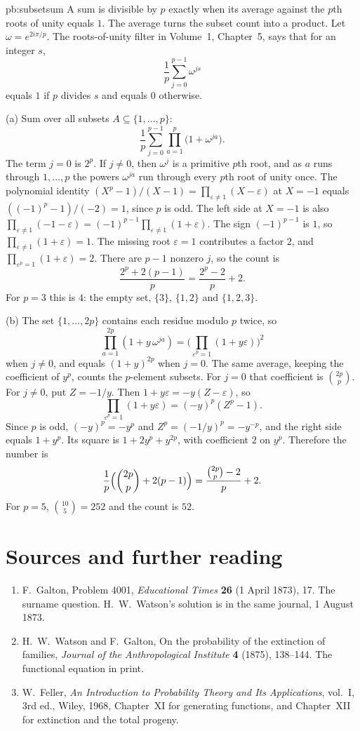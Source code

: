\begin{solution}{pb:subsetsum}
\idea A sum is divisible by $p$ exactly when its average against the $p$th roots of unity equals $1$. The average turns the subset count into a product.
\writeup Let $\omega=e^{2i\pi/p}$. The roots-of-unity filter in Volume~1, Chapter~5, says that for an integer $s$,
\[
 \frac1p\sum_{j=0}^{p-1}\omega^{js}
\]
equals $1$ if $p$ divides $s$ and equals $0$ otherwise.

(a) Sum over all subsets $A\subseteq\{1,\ldots,p\}$:
\[
 \frac1p\sum_{j=0}^{p-1}\prod_{a=1}^p\bigl(1+\omega^{ja}\bigr).
\]
The term $j=0$ is $2^p$. If $j\not=0$, then $\omega^j$ is a primitive $p$th root, and as $a$ runs through $1,\ldots,p$ the powers $\omega^{ja}$ run through every $p$th root of unity once. The polynomial identity $(X^p-1)/(X-1)=\prod_{\varepsilon\ne1}(X-\varepsilon)$ at $X=-1$ equals $((-1)^p-1)/(-2)=1$, since $p$ is odd. The left side at $X=-1$ is also $\prod_{\varepsilon\ne1}(-1-\varepsilon)=(-1)^{p-1}\prod_{\varepsilon\ne1}(1+\varepsilon)$. The sign $(-1)^{p-1}$ is $1$, so $\prod_{\varepsilon\ne1}(1+\varepsilon)=1$. The missing root $\varepsilon=1$ contributes a factor $2$, and $\prod_{\varepsilon^p=1}(1+\varepsilon)=2$. There are $p-1$ nonzero $j$, so the count is
\[
 \frac{2^p+2(p-1)}p=\frac{2^p-2}p+2.
\]
For $p=3$ this is $4$: the empty set, $\{3\}$, $\{1,2\}$ and $\{1,2,3\}$.

(b) The set $\{1,\ldots,2p\}$ contains each residue modulo $p$ twice, so
\[
 \prod_{a=1}^{2p}(1+y\,\omega^{ja})=\Biggl(\prod_{\varepsilon^p=1}(1+y\varepsilon)\Biggr)^2
\]
when $j\not=0$, and equals $(1+y)^{2p}$ when $j=0$. The same average, keeping the coefficient of $y^p$, counts the $p$-element subsets. For $j=0$ that coefficient is $\binom{2p}p$. For $j\not=0$, put $Z=-1/y$. Then $1+y\varepsilon=-y(Z-\varepsilon)$, so
\[
 \prod_{\varepsilon^p=1}(1+y\varepsilon)=(-y)^p(Z^p-1).
\]
Since $p$ is odd, $(-y)^p=-y^p$ and $Z^p=(-1/y)^p=-y^{-p}$, and the right side equals $1+y^p$. Its square is $1+2y^p+y^{2p}$, with coefficient $2$ on $y^p$. Therefore the number is
\[
 \frac1p\Bigl(\binom{2p}p+2(p-1)\Bigr)=\frac{\binom{2p}p-2}p+2.
\]
For $p=5$, $\binom{10}5=252$ and the count is $52$.
\end{solution}

\section*{Sources and further reading}

\begin{enumerate}
\item F.~Galton, Problem 4001, \emph{Educational Times} \textbf{26} (1 April 1873), 17. The surname question. H.~W.~Watson’s solution is in the same journal, 1 August 1873.
\item H.~W.~Watson and F.~Galton, On the probability of the extinction of families, \emph{Journal of the Anthropological Institute} \textbf{4} (1875), 138--144. The functional equation in print.
\item W.~Feller, \emph{An Introduction to Probability Theory and Its Applications}, vol.~I, 3rd ed., Wiley, 1968, Chapter~XI for generating functions, and Chapter~XII for extinction and the total progeny.
\end{enumerate}
